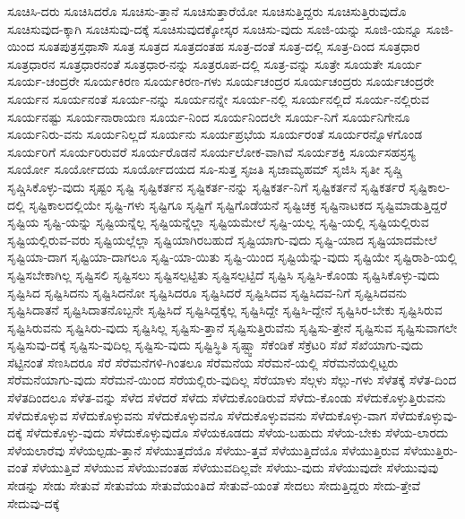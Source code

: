 {ಸೂಚಿಸಿ-ದರು
ಸೂಚಿಸಿದರೊ
ಸೂಚಿಸು-ತ್ತಾನೆ
ಸೂಚಿಸುತ್ತಾರೆಯೋ
ಸೂಚಿಸುತ್ತಿದ್ದರು
ಸೂಚಿಸುತ್ತಿರುವುದೊ
ಸೂಚಿಸುವುದ-ಕ್ಕಾಗಿ
ಸೂಚಿಸುವು-ದಕ್ಕೆ
ಸೂಚಿಸುವುದಕ್ಕೋಸ್ಕರ
ಸೂಚಿಸು-ವುದು
ಸೂಜಿ-ಯನ್ನು
ಸೂಜಿ-ಯನ್ನೂ
ಸೂಜಿ-ಯಿಂದ
ಸೂತಪುತ್ರಸ್ತಥಾಸೌ
ಸೂತ್ರ
ಸೂತ್ರದ
ಸೂತ್ರದಂತಹ
ಸೂತ್ರ-ದಂತೆ
ಸೂತ್ರ-ದಲ್ಲಿ
ಸೂತ್ರ-ದಿಂದ
ಸೂತ್ರಧಾರ
ಸೂತ್ರಧಾರನ
ಸೂತ್ರಧಾರನಂತೆ
ಸೂತ್ರಧಾರ-ನನ್ನು
ಸೂತ್ರರೂಪ-ದಲ್ಲಿ
ಸೂತ್ರ-ವನ್ನು
ಸೂತ್ರೇ
ಸೂಯತೇ
ಸೂರ್ಯ
ಸೂರ್ಯ-ಚಂದ್ರರೇ
ಸೂರ್ಯಕಿರಣ
ಸೂರ್ಯಕಿರಣ-ಗಳು
ಸೂರ್ಯಚಂದ್ರರ
ಸೂರ್ಯಚಂದ್ರರು
ಸೂರ್ಯಚಂದ್ರರೇ
ಸೂರ್ಯನ
ಸೂರ್ಯನಂತೆ
ಸೂರ್ಯ-ನನ್ನು
ಸೂರ್ಯನನ್ನೇ
ಸೂರ್ಯ-ನಲ್ಲಿ
ಸೂರ್ಯನಲ್ಲಿದೆ
ಸೂರ್ಯ-ನಲ್ಲಿರುವ
ಸೂರ್ಯನಷ್ಟು
ಸೂರ್ಯನಾರಾಯಣ
ಸೂರ್ಯ-ನಿಂದ
ಸೂರ್ಯನಿಂದಲೇ
ಸೂರ್ಯ-ನಿಗೆ
ಸೂರ್ಯನಿಗೇನೂ
ಸೂರ್ಯನಿರು-ವನು
ಸೂರ್ಯನಿಲ್ಲದೆ
ಸೂರ್ಯನು
ಸೂರ್ಯಪ್ರಭೆಯ
ಸೂರ್ಯರಂತೆ
ಸೂರ್ಯರನ್ನೊಳಗೊಂಡ
ಸೂರ್ಯರಿಗೆ
ಸೂರ್ಯರಿರುವರೆ
ಸೂರ್ಯರೊಡನೆ
ಸೂರ್ಯಲೋಕ-ವಾಗಿವೆ
ಸೂರ್ಯಶಕ್ತಿ
ಸೂರ್ಯಸಹಸ್ರಸ್ಯ
ಸೂರ್ಯೋ
ಸೂರ್ಯೋದಯ
ಸೂರ್ಯೋದಯದ
ಸೂ-ಸುತ್ತ
ಸೃಜತಿ
ಸೃಜಾಮ್ಯಹಮ್
ಸೃಜಿಸಿ
ಸೃತೀ
ಸೃಷ್ಚಿ
ಸೃಷ್ಚಿಸಿಕೊಳ್ಳು-ವುದು
ಸೃಷ್ಟಂ
ಸೃಷ್ಟಿ
ಸೃಷ್ಟಿಕರ್ತನ
ಸೃಷ್ಟಿಕರ್ತ-ನನ್ನು
ಸೃಷ್ಟಿಕರ್ತ-ನಿಗೆ
ಸೃಷ್ಟಿಕರ್ತನೆ
ಸೃಷ್ಟಿಕರ್ತರೆ
ಸೃಷ್ಟಿಕಾಲ-ದಲ್ಲಿ
ಸೃಷ್ಟಿಕಾಲದಲ್ಲಿಯೇ
ಸೃಷ್ಟಿ-ಗಳು
ಸೃಷ್ಟಿಗೂ
ಸೃಷ್ಟಿಗೆ
ಸೃಷ್ಟಿಗೊಡೆಯನೆ
ಸೃಷ್ಟಿಚಕ್ರ
ಸೃಷ್ಟಿನಾಟಕದ
ಸೃಷ್ಟಿಮಾಡುತ್ತಿದ್ದರೆ
ಸೃಷ್ಟಿಯ
ಸೃಷ್ಟಿ-ಯನ್ನು
ಸೃಷ್ಟಿಯನ್ನೆಲ್ಲ
ಸೃಷ್ಟಿಯನ್ನೆಲ್ಲಾ
ಸೃಷ್ಟಿಯಮೇಲೆ
ಸೃಷ್ಟಿ-ಯಲ್ಲ
ಸೃಷ್ಟಿ-ಯಲ್ಲಿ
ಸೃಷ್ಟಿಯಲ್ಲಿರುವ
ಸೃಷ್ಟಿಯಲ್ಲಿರುವ-ವರು
ಸೃಷ್ಟಿಯಲ್ಲೆಲ್ಲಾ
ಸೃಷ್ಟಿಯಾಗಿರಬಹುದೆ
ಸೃಷ್ಟಿಯಾಗು-ವುದು
ಸೃಷ್ಟಿ-ಯಾದ
ಸೃಷ್ಟಿಯಾದಮೇಲೆ
ಸೃಷ್ಟಿಯಾ-ದಾಗ
ಸೃಷ್ಟಿಯಾ-ದಾಗಲೂ
ಸೃಷ್ಟಿ-ಯಾ-ಯಿತು
ಸೃಷ್ಟಿ-ಯಿಂದ
ಸೃಷ್ಟಿಯೆನ್ನು-ವುದು
ಸೃಷ್ಟಿಯೇ
ಸೃಷ್ಟಿರಾಶಿ-ಯಲ್ಲಿ
ಸೃಷ್ಟಿಸಬೇಕಾಗಿಲ್ಲ
ಸೃಷ್ಟಿಸಲಿ
ಸೃಷ್ಟಿಸಲು
ಸೃಷ್ಟಿಸಲ್ಪಟ್ಟಿತು
ಸೃಷ್ಟಿಸಲ್ಪಟ್ಟಿದೆ
ಸೃಷ್ಟಿಸಿ
ಸೃಷ್ಟಿಸಿ-ಕೊಂಡು
ಸೃಷ್ಟಿಸಿಕೊಳ್ಳು-ವುದು
ಸೃಷ್ಟಿಸಿದ
ಸೃಷ್ಟಿಸಿದನು
ಸೃಷ್ಟಿಸಿದನೋ
ಸೃಷ್ಟಿಸಿದರೂ
ಸೃಷ್ಟಿಸಿದರೆ
ಸೃಷ್ಟಿಸಿದವ
ಸೃಷ್ಟಿಸಿದವ-ನಿಗೆ
ಸೃಷ್ಟಿಸಿದವನು
ಸೃಷ್ಟಿಸಿದಾತನೆ
ಸೃಷ್ಟಿಸಿದಾತನೊಬ್ಬನೇ
ಸೃಷ್ಟಿಸಿದೆ
ಸೃಷ್ಟಿಸಿದ್ದಕ್ಕೆಲ್ಲ
ಸೃಷ್ಟಿಸಿದ್ದೇ
ಸೃಷ್ಟಿಸಿ-ದ್ದೇನೆ
ಸೃಷ್ಟಿಸಿರ-ಬೇಕು
ಸೃಷ್ಟಿಸಿರುವ
ಸೃಷ್ಟಿಸಿರುವನು
ಸೃಷ್ಟಿಸಿರು-ವುದು
ಸೃಷ್ಟಿಸಿಲ್ಲ
ಸೃಷ್ಟಿಸು-ತ್ತಾನೆ
ಸೃಷ್ಟಿಸುತ್ತಿರುವೆನು
ಸೃಷ್ಟಿಸು-ತ್ತೇನೆ
ಸೃಷ್ಟಿಸುವ
ಸೃಷ್ಟಿಸುವಾಗಲೇ
ಸೃಷ್ಟಿಸುವು-ದಕ್ಕೆ
ಸೃಷ್ಟಿಸು-ವುದಿಲ್ಲ
ಸೃಷ್ಟಿಸು-ವುದು
ಸೃಷ್ಟಿಸ್ಥಿತಿ
ಸೃಷ್ಟ್ವಾ
ಸೆಕೆಂಡಿಕೆ
ಸೆಕ್ರೆಟರಿ
ಸೆಖೆ
ಸೆಖೆಯಾಗು-ವುದು
ಸೆಟ್ಟಿನಂತೆ
ಸೆಣಸಿದರೂ
ಸೆರೆ
ಸೆರೆಮನೆಗಳಿ-ಗಿಂತಲೂ
ಸೆರೆಮನೆಯ
ಸೆರೆಮನೆ-ಯಲ್ಲಿ
ಸೆರೆಮನೆಯಲ್ಲಿಟ್ಟರು
ಸೆರೆಮನೆಯಾಗು-ವುದು
ಸೆರೆಮನೆ-ಯಿಂದ
ಸೆರೆಯಲ್ಲಿರು-ವುದಿಲ್ಲ
ಸೆರೆಯಾಳು
ಸೆಲ್ಗಳು
ಸೆಲ್ಲು-ಗಳು
ಸೆಳೆತಕ್ಕೆ
ಸೆಳೆತ-ದಿಂದ
ಸೆಳೆತದಿಂದಲೂ
ಸೆಳೆತ-ವನ್ನು
ಸೆಳೆದ
ಸೆಳೆದರೆ
ಸೆಳೆದು
ಸೆಳೆದುಕೊಂಡಿರುವೆ
ಸೆಳೆದು-ಕೊಂಡು
ಸೆಳೆದುಕೊಳ್ಳುತ್ತಿರುವನು
ಸೆಳೆದುಕೊಳ್ಳುವ
ಸೆಳೆದುಕೊಳ್ಳುವನು
ಸೆಳೆದುಕೊಳ್ಳುವನೊ
ಸೆಳೆದುಕೊಳ್ಳುವವನು
ಸೆಳೆದುಕೊಳ್ಳು-ವಾಗ
ಸೆಳೆದುಕೊಳ್ಳುವು-ದಕ್ಕೆ
ಸೆಳೆದುಕೊಳ್ಳು-ವುದು
ಸೆಳೆದುಕೊಳ್ಳುವುದೊ
ಸೆಳೆಯಕೂಡದು
ಸೆಳೆಯ-ಬಹುದು
ಸೆಳೆಯ-ಬೇಕು
ಸೆಳೆಯ-ಲಾರದು
ಸೆಳೆಯಲಾರೆವು
ಸೆಳೆಯಲ್ಪಡು-ತ್ತಾನೆ
ಸೆಳೆಯುತ್ತದೆಯೊ
ಸೆಳೆಯು-ತ್ತವೆ
ಸೆಳೆಯುತ್ತಿದೆಯೊ
ಸೆಳೆಯುತ್ತಿರುವ
ಸೆಳೆಯುತ್ತಿರು-ವಂತೆ
ಸೆಳೆಯುತ್ತಿವೆ
ಸೆಳೆಯುವ
ಸೆಳೆಯುವಂತಹ
ಸೆಳೆಯುವದಿಲ್ಲವೇ
ಸೆಳೆಯು-ವುದು
ಸೆಳೆಯುವುದೇ
ಸೆಳೆಯುವುವು
ಸೇಡನ್ನು
ಸೇಡು
ಸೇತುವೆ
ಸೇತುವೆಯ
ಸೇತುವೆಯಂತಿದೆ
ಸೇತುವೆ-ಯಂತೆ
ಸೇದಲು
ಸೇದುತ್ತಿದ್ದರು
ಸೇದು-ತ್ತೇವೆ
ಸೇದುವು-ದಕ್ಕೆ
}
